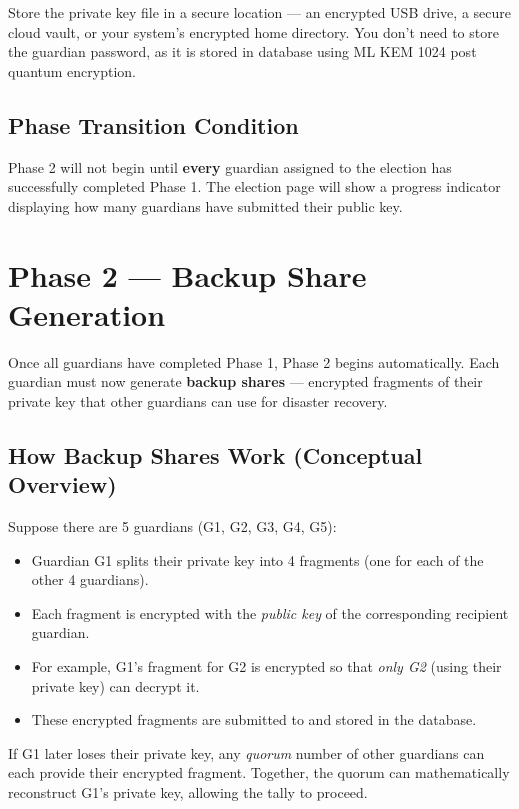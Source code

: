 \documentclass[12pt,a4paper,openany]{book}
\begin{document}
\begin{tcolorbox}[tipbox]
	Store the private key file in a secure location --- an encrypted USB drive, a secure cloud vault, or your system's encrypted home directory. You don't need to store the guardian password, as it is stored in database using ML KEM 1024 post quantum encryption.
\end{tcolorbox}

\subsection{Phase Transition Condition}

Phase 2 will not begin until \textbf{every} guardian assigned to the election has successfully completed Phase 1. The election page will show a progress indicator displaying how many guardians have submitted their public key.

\section{Phase 2 --- Backup Share Generation}
\label{sec:phase2}

Once all guardians have completed Phase 1, Phase 2 begins automatically. Each guardian must now generate \textbf{backup shares} --- encrypted fragments of their private key that other guardians can use for disaster recovery.

\subsection{How Backup Shares Work (Conceptual Overview)}

Suppose there are 5 guardians (G1, G2, G3, G4, G5):

\begin{itemize}
	\item Guardian G1 splits their private key into 4 fragments (one for each of the other 4 guardians).
	\item Each fragment is encrypted with the \emph{public key} of the corresponding recipient guardian.
	\item For example, G1's fragment for G2 is encrypted so that \emph{only G2} (using their private key) can decrypt it.
	\item These encrypted fragments are submitted to and stored in the database.
\end{itemize}

If G1 later loses their private key, any \emph{quorum} number of other guardians can each provide their encrypted fragment. Together, the quorum can mathematically reconstruct G1's private key, allowing the tally to proceed.
\end{document}
